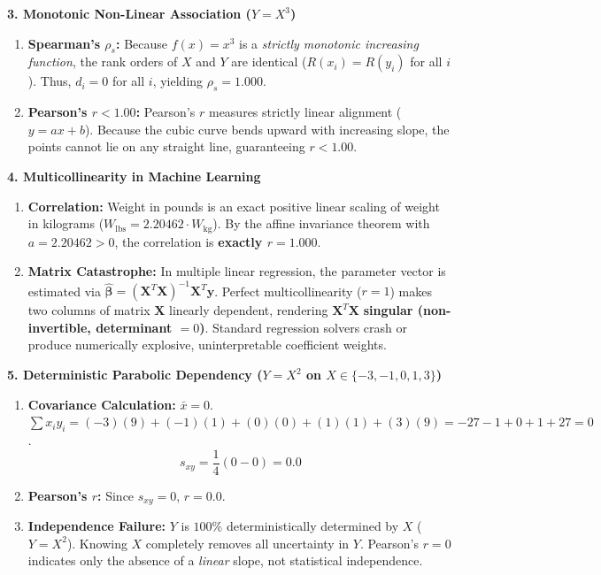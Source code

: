 \textbf{3. Monotonic Non-Linear Association ($Y = X^3$)}
\begin{enumerate}
    \item \textbf{Spearman's $\rho_s$:} Because $f(x) = x^3$ is a \emph{strictly monotonic increasing function}, the rank orders of $X$ and $Y$ are identical ($R(x_i) = R(y_i)$ for all $i$). Thus, $d_i = 0$ for all $i$, yielding $\rho_s = \mathbf{1.000}$.
    \item \textbf{Pearson's $r < 1.00$:} Pearson's $r$ measures strictly linear alignment ($y = ax + b$). Because the cubic curve bends upward with increasing slope, the points cannot lie on any straight line, guaranteeing $r < 1.00$.
\end{enumerate}

\textbf{4. Multicollinearity in Machine Learning}
\begin{enumerate}
    \item \textbf{Correlation:} Weight in pounds is an exact positive linear scaling of weight in kilograms ($W_{\text{lbs}} = 2.20462 \cdot W_{\text{kg}}$). By the affine invariance theorem with $a = 2.20462 > 0$, the correlation is \textbf{exactly $r = 1.000$}.
    \item \textbf{Matrix Catastrophe:} In multiple linear regression, the parameter vector is estimated via $\hat{\boldsymbol{\beta}} = (\mathbf{X}^T \mathbf{X})^{-1} \mathbf{X}^T \mathbf{y}$. Perfect multicollinearity ($r = 1$) makes two columns of matrix $\mathbf{X}$ linearly dependent, rendering $\mathbf{X}^T \mathbf{X}$ \textbf{singular (non-invertible, determinant $= 0$)}. Standard regression solvers crash or produce numerically explosive, uninterpretable coefficient weights.
\end{enumerate}

\textbf{5. Deterministic Parabolic Dependency ($Y = X^2$ on $X \in \{-3, -1, 0, 1, 3\}$)}
\begin{enumerate}
    \item \textbf{Covariance Calculation:} $\bar{x} = 0$. $\sum x_i y_i = (-3)(9) + (-1)(1) + (0)(0) + (1)(1) + (3)(9) = -27 - 1 + 0 + 1 + 27 = 0$.
    $$s_{xy} = \frac{1}{4}(0 - 0) = \mathbf{0.0}$$
    \item \textbf{Pearson's $r$:} Since $s_{xy} = 0$, $r = \mathbf{0.0}$.
    \item \textbf{Independence Failure:} $Y$ is $100\%$ deterministically determined by $X$ ($Y = X^2$). Knowing $X$ completely removes all uncertainty in $Y$. Pearson's $r = 0$ indicates only the absence of a \emph{linear} slope, not statistical independence.
\end{enumerate}

